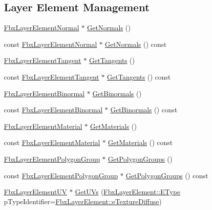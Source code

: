 \subsection*{Layer Element Management}
\begin{DoxyCompactItemize}
\item 
\hyperlink{class_fbx_layer_element_normal}{Fbx\+Layer\+Element\+Normal} $\ast$ \hyperlink{class_fbx_layer_ae29a7357ab32d3a298d85940e703b65d}{Get\+Normals} ()
\item 
const \hyperlink{class_fbx_layer_element_normal}{Fbx\+Layer\+Element\+Normal} $\ast$ \hyperlink{class_fbx_layer_ad727fbf6b7d9918b48d706d5a19ebc42}{Get\+Normals} () const
\item 
\hyperlink{class_fbx_layer_element_tangent}{Fbx\+Layer\+Element\+Tangent} $\ast$ \hyperlink{class_fbx_layer_a6c1e9d8dead9600029e27d690ee0e662}{Get\+Tangents} ()
\item 
const \hyperlink{class_fbx_layer_element_tangent}{Fbx\+Layer\+Element\+Tangent} $\ast$ \hyperlink{class_fbx_layer_ad5fbd299340cc987a8202f28d64fb341}{Get\+Tangents} () const
\item 
\hyperlink{class_fbx_layer_element_binormal}{Fbx\+Layer\+Element\+Binormal} $\ast$ \hyperlink{class_fbx_layer_a9b089342d79d32531aa27ec83b71a43d}{Get\+Binormals} ()
\item 
const \hyperlink{class_fbx_layer_element_binormal}{Fbx\+Layer\+Element\+Binormal} $\ast$ \hyperlink{class_fbx_layer_a7ece190d2b12f0ca7db403e5a82d4607}{Get\+Binormals} () const
\item 
\hyperlink{class_fbx_layer_element_material}{Fbx\+Layer\+Element\+Material} $\ast$ \hyperlink{class_fbx_layer_acb250792d05dbe8dde9a44d8d2ddea50}{Get\+Materials} ()
\item 
const \hyperlink{class_fbx_layer_element_material}{Fbx\+Layer\+Element\+Material} $\ast$ \hyperlink{class_fbx_layer_a81d54784c6b6b5298c03263b4261e577}{Get\+Materials} () const
\item 
\hyperlink{class_fbx_layer_element_polygon_group}{Fbx\+Layer\+Element\+Polygon\+Group} $\ast$ \hyperlink{class_fbx_layer_ab199f10be53e1c787ac36a3bc0619b60}{Get\+Polygon\+Groups} ()
\item 
const \hyperlink{class_fbx_layer_element_polygon_group}{Fbx\+Layer\+Element\+Polygon\+Group} $\ast$ \hyperlink{class_fbx_layer_ad8b69cfe2c06bada21d0643e9018774b}{Get\+Polygon\+Groups} () const
\item 
\hyperlink{class_fbx_layer_element_u_v}{Fbx\+Layer\+Element\+UV} $\ast$ \hyperlink{class_fbx_layer_aa7b54accfb183e671af671f297dfff7e}{Get\+U\+Vs} (\hyperlink{class_fbx_layer_element_a8c95c5cd880b56c776acd379bd86f42c}{Fbx\+Layer\+Element\+::\+E\+Type} p\+Type\+Identifier=\hyperlink{class_fbx_layer_element_a8c95c5cd880b56c776acd379bd86f42ca09829e6ecf512e7ae04d9ad8de1342fa}{Fbx\+Layer\+Element\+::e\+Texture\+Diffuse})

\end{DoxyCompactItemize}
